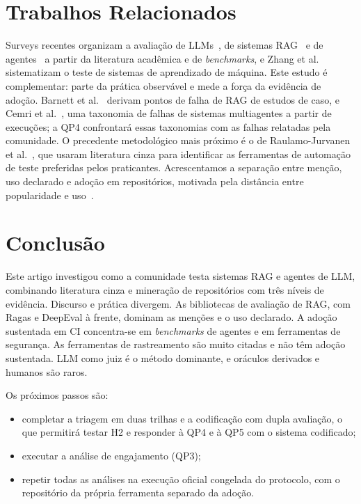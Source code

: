 \documentclass[sigconf]{acmart}
\begin{document}
\section{Trabalhos Relacionados}
\label{sec:relacionados}

Surveys recentes organizam a avaliação de LLMs~\cite{chang2024survey}, de sistemas RAG~\cite{yu2024ragsurvey} e de agentes~\cite{yehudai2025agents} a partir da literatura acadêmica e de \textit{benchmarks}, e Zhang et al.~\cite{zhang2022mltesting} sistematizam o teste de sistemas de aprendizado de máquina. Este estudo é complementar: parte da prática observável e mede a força da evidência de adoção. Barnett et al.~\cite{barnett2024seven} derivam pontos de falha de RAG de estudos de caso, e Cemri et al.~\cite{cemri2025multiagent}, uma taxonomia de falhas de sistemas multiagentes a partir de execuções; a QP4 confrontará essas taxonomias com as falhas relatadas pela comunidade. O precedente metodológico mais próximo é o de Raulamo-Jurvanen et al.~\cite{raulamo2017choosing}, que usaram literatura cinza para identificar as ferramentas de automação de teste preferidas pelos praticantes. Acrescentamos a separação entre menção, uso declarado e adoção em repositórios, motivada pela distância entre popularidade e uso~\cite{borges2018star}.

\section{Conclusão}
\label{sec:conclusao}

Este artigo investigou como a comunidade testa sistemas RAG e agentes de LLM, combinando literatura cinza e mineração de repositórios com três níveis de evidência. Discurso e prática divergem. As bibliotecas de avaliação de RAG, com Ragas e DeepEval à frente, dominam as menções e o uso declarado. A adoção sustentada em CI concentra-se em \textit{benchmarks} de agentes e em ferramentas de segurança. As ferramentas de rastreamento são muito citadas e não têm adoção sustentada. LLM como juiz é o método dominante, e oráculos derivados e humanos são raros.

Os próximos passos são:
\begin{itemize}
  \item completar a triagem em duas trilhas e a codificação com dupla avaliação, o que permitirá testar H2 e responder à QP4 e à QP5 com o sistema codificado;
  \item executar a análise de engajamento (QP3);
  \item repetir todas as análises na execução oficial congelada do protocolo, com o repositório da própria ferramenta separado da adoção.
\end{itemize}
\end{document}
